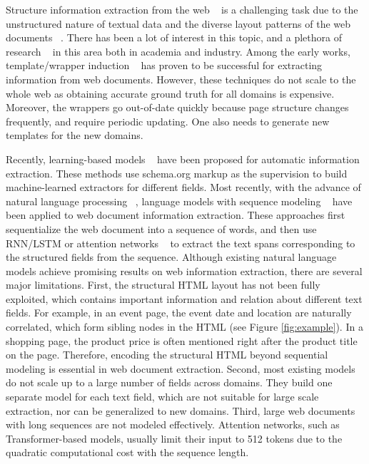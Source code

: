 \documentclass[sigconf]{acmart}
\begin{document}
Structure information extraction from the web ~\cite{CrescenziM04,CarlsonS08,HaoCPZ11,ManabeT15,ZhanZ20} is a challenging task due to the unstructured nature of textual data and the diverse layout patterns of the web documents ~\cite{SleimanC13,MajumderPTWZN20}. There has been a lot of interest in this topic, and a plethora of research ~\cite{Yang00BN20,ChengQSH020,ZhangYXHLLLS21,TangXJWCXWWL21} in this area both in academia and industry.
Among the early works, template/wrapper induction ~\cite{DalviKS11,ProskurniaCPKWK17,LockardDSE18} has proven to be successful for extracting information from web documents. However, these techniques do not scale to the whole web as obtaining accurate ground truth for all domains is expensive. Moreover, the wrappers go out-of-date quickly because page structure changes frequently, and require periodic updating. One also needs to generate new templates for the new domains.

Recently, learning-based models ~\cite{GogarHS16,WangKGS19} have been proposed for automatic information extraction. These methods use schema.org markup \cite{TempelmeierDD18} as the supervision to build machine-learned extractors for different fields. Most recently, with the advance of natural language processing ~\cite{VaswaniSPUJGKP17,DevlinCLT19,abs-2004-05150}, language models with sequence modeling ~\cite{abs-2107-06955,WangWTJMDH21} have been applied to web document information extraction. These approaches first sequentialize the web document into a sequence of words, and then use RNN/LSTM \cite{ZhengMD018,Lin0VT20,abs-2101-02415} or attention networks ~\cite{XuXL0WWLFZCZZ20,HwangYPYS21} to extract the text spans corresponding to the structured fields from the sequence. Although existing natural language models achieve promising results on web information extraction, there are several major limitations.
First, the structural HTML layout has not been fully exploited, which contains important information and relation about different text fields.
For example, in an event page, the event date and location are naturally correlated, which form sibling nodes in the HTML (see Figure \ref{fig:example}). In a shopping page, the product price is often mentioned right after the product title on the page. Therefore, encoding the structural HTML beyond sequential modeling is essential in web document extraction.
Second, most existing models do not scale up to a large number of fields across domains. They build one separate model for each text field, which are not suitable for large scale extraction, nor can be generalized to new domains.
Third, large web documents with long sequences are not modeled effectively. Attention networks, such as Transformer-based models, usually limit their input to 512 tokens due to the quadratic computational cost with the sequence length.
\end{document}
